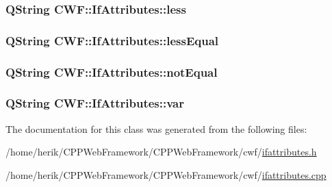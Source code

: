 \hypertarget{class_c_w_f_1_1_if_attributes_a16843cddaa8d16acf67a31a1258826d5}{
\subsubsection[{less}]{\setlength{\rightskip}{0pt plus 5cm}Q\+String C\+W\+F\+::\+If\+Attributes\+::less}}\label{class_c_w_f_1_1_if_attributes_a16843cddaa8d16acf67a31a1258826d5}
\hypertarget{class_c_w_f_1_1_if_attributes_aea6e443b32ec1deaf0d0f7025d49b9b2}{
\subsubsection[{less\+Equal}]{\setlength{\rightskip}{0pt plus 5cm}Q\+String C\+W\+F\+::\+If\+Attributes\+::less\+Equal}}\label{class_c_w_f_1_1_if_attributes_aea6e443b32ec1deaf0d0f7025d49b9b2}
\hypertarget{class_c_w_f_1_1_if_attributes_aebb39701f4b50e474998c95d099ac977}{
\subsubsection[{not\+Equal}]{\setlength{\rightskip}{0pt plus 5cm}Q\+String C\+W\+F\+::\+If\+Attributes\+::not\+Equal}}\label{class_c_w_f_1_1_if_attributes_aebb39701f4b50e474998c95d099ac977}
\hypertarget{class_c_w_f_1_1_if_attributes_a57a2a9012c72fb354b2bf1e30f2bd832}{
\subsubsection[{var}]{\setlength{\rightskip}{0pt plus 5cm}Q\+String C\+W\+F\+::\+If\+Attributes\+::var}}\label{class_c_w_f_1_1_if_attributes_a57a2a9012c72fb354b2bf1e30f2bd832}


The documentation for this class was generated from the following files\+:\begin{DoxyCompactItemize}
\item 
/home/herik/\+C\+P\+P\+Web\+Framework/\+C\+P\+P\+Web\+Framework/cwf/\hyperlink{ifattributes_8h}{ifattributes.\+h}\item 
/home/herik/\+C\+P\+P\+Web\+Framework/\+C\+P\+P\+Web\+Framework/cwf/\hyperlink{ifattributes_8cpp}{ifattributes.\+cpp}\end{DoxyCompactItemize}
